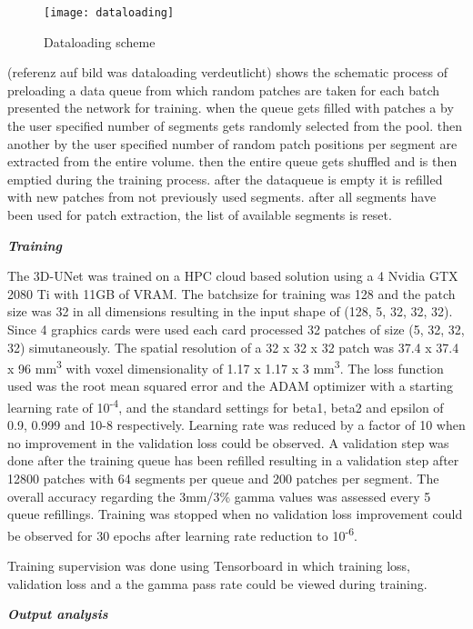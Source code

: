 \begin{figure}
    \centering
    \texttt{[image: dataloading]}
    \caption{Dataloading scheme}\label{fig: dataloading}
\end{figure}

(referenz auf bild was dataloading verdeutlicht) shows the schematic process of preloading a data queue from which random patches are taken for each batch presented the network for training. when the queue gets filled with patches a by the user specified number of segments gets randomly selected from the pool. then another by the user specified number of random patch positions per segment are extracted from the entire volume. then the entire queue gets shuffled and is then emptied during the training process. after the dataqueue is empty it is refilled with new patches from not previously used segments.
after all segments have been used for patch extraction, the list of available segments is reset.


\textbf{\emph{Training}}

The 3D-UNet was trained on a HPC cloud based solution using a 4 Nvidia GTX 2080 Ti with 11GB of VRAM. The batchsize for training was 128 and the patch size was 32 in all dimensions resulting in the input shape of (128, 5, 32, 32, 32). Since 4 graphics cards were used each card processed 32 patches of size (5, 32, 32, 32) simutaneously. The spatial resolution of a 32 x 32 x 32 patch was 37.4 x 37.4 x 96 mm\textsuperscript{3} with voxel dimensionality of 1.17 x 1.17 x 3 mm\textsuperscript{3}. 
The loss function used was the root mean squared error and the ADAM optimizer with a starting learning rate of 10\textsuperscript{-4}, and the standard settings for beta1, beta2 and epsilon of 0.9, 0.999 and 10-8 respectively. Learning rate was reduced by a factor of 10 when no improvement in the validation loss could be observed. 
A validation step was done after the training queue has been refilled resulting in a validation step after 12800 patches with 64 segments per queue and 200 patches per segment. The overall accuracy regarding the 3mm/3\% gamma values was assessed every 5 queue refillings. Training was stopped when no validation loss improvement could be observed for 30 epochs after learning rate reduction to 10\textsuperscript{-6}.

Training supervision was done using Tensorboard in which training loss, validation loss and a the gamma pass rate could be viewed during training. 


\textbf{\emph{Output analysis}}

